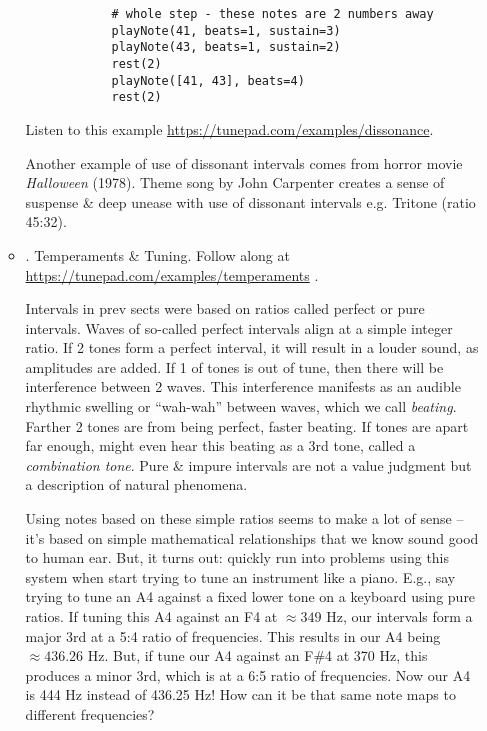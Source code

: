 \documentclass{article}
\begin{document}
\begin{itemize}
\begin{itemize}
\begin{verbatim}
			# whole step - these notes are 2 numbers away
			playNote(41, beats=1, sustain=3)
			playNote(43, beats=1, sustain=2)
			rest(2)
			playNote([41, 43], beats=4)
			rest(2)
		\end{verbatim}
		Listen to this example \url{https://tunepad.com/examples/dissonance}.
		
		Another example of use of dissonant intervals comes from horror movie {\it Halloween} (1978). Theme song by {\sc John Carpenter} creates a sense of suspense \& deep unease with use of dissonant intervals e.g. Tritone (ratio 45:32).
		\item {. Temperaments \& Tuning.} Follow along at \url{https://tunepad.com/examples/temperaments} .
		
		Intervals in prev sects were based on ratios called perfect or pure intervals. Waves of so-called perfect intervals align at a simple integer ratio. If 2 tones form a perfect interval, it will result in a louder sound, as amplitudes are added. If 1 of tones is out of tune, then there will be interference between 2 waves. This interference manifests as an audible rhythmic swelling or ``wah-wah'' between waves, which we call {\it beating}. Farther 2 tones are from being perfect, faster beating. If tones are apart far enough, might even hear this beating as a 3rd tone, called a {\it combination tone}. Pure \& impure intervals are not a value judgment but a description of natural phenomena.
		
		Using notes based on these simple ratios seems to make a lot of sense -- it's based on simple mathematical relationships that we know sound good to human ear. But, it turns out: quickly run into problems using this system when start trying to tune an instrument like a piano. E.g., say trying to tune an A4 against a fixed lower tone on a keyboard using pure ratios. If tuning this A4 against an F4 at $\approx349$ Hz, our intervals form a major 3rd at a 5:4 ratio of frequencies. This results in our A4 being $\approx436.26$ Hz. But, if tune our A4 against an F\#4 at 370 Hz, this produces a minor 3rd, which is at a 6:5 ratio of frequencies. Now our A4 is 444 Hz instead of 436.25 Hz! How can it be that same note maps to different frequencies?
		

\end{itemize}
\end{itemize}
\end{document}
